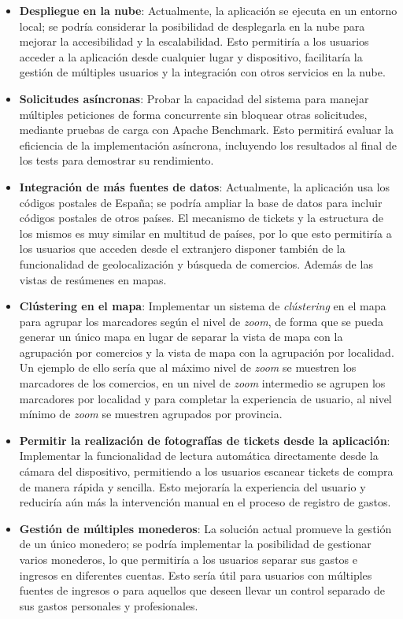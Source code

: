 \begin{itemize}
    \item \textbf{Despliegue en la nube}: Actualmente, la aplicación se ejecuta en un entorno local; se podría considerar la posibilidad de desplegarla en la nube para mejorar la accesibilidad y la escalabilidad. Esto permitiría a los usuarios acceder a la aplicación desde cualquier lugar y dispositivo, facilitaría la gestión de múltiples usuarios y la integración con otros servicios en la nube.
    \item \textbf{Solicitudes asíncronas}: Probar la capacidad del sistema para manejar múltiples peticiones de forma concurrente sin bloquear otras solicitudes, mediante pruebas de carga con Apache Benchmark. Esto permitirá evaluar la eficiencia de la implementación asíncrona, incluyendo los resultados al final de los tests para demostrar su rendimiento.
    \item \textbf{Integración de más fuentes de datos}: Actualmente, la aplicación usa los códigos postales de España; se podría ampliar la base de datos para incluir códigos postales de otros países. El mecanismo de tickets y la estructura de los mismos es muy similar en multitud de países, por lo que esto permitiría a los usuarios que acceden desde el extranjero disponer también de la funcionalidad de geolocalización y búsqueda de comercios. Además de las vistas de resúmenes en mapas.
    \item \textbf{Clústering en el mapa}: Implementar un sistema de \textit{clústering} en el mapa para agrupar los marcadores según el nivel de \textit{zoom}, de forma que se pueda generar un único mapa en lugar de separar la vista de mapa con la agrupación por comercios y la vista de mapa con la agrupación por localidad. Un ejemplo de ello sería que al máximo nivel de \textit{zoom} se muestren los marcadores de los comercios, en un nivel de \textit{zoom} intermedio se agrupen los marcadores por localidad y para completar la experiencia de usuario, al nivel mínimo de \textit{zoom} se muestren agrupados por provincia.
    \item \textbf{Permitir la realización de fotografías de tickets desde la aplicación}: Implementar la funcionalidad de lectura automática directamente desde la cámara del dispositivo, permitiendo a los usuarios escanear tickets de compra de manera rápida y sencilla. Esto mejoraría la experiencia del usuario y reduciría aún más la intervención manual en el proceso de registro de gastos.
    \item \textbf{Gestión de múltiples monederos}: La solución actual promueve la gestión de un único monedero; se podría implementar la posibilidad de gestionar varios monederos, lo que permitiría a los usuarios separar sus gastos e ingresos en diferentes cuentas. Esto sería útil para usuarios con múltiples fuentes de ingresos o para aquellos que deseen llevar un control separado de sus gastos personales y profesionales.

\end{itemize}
